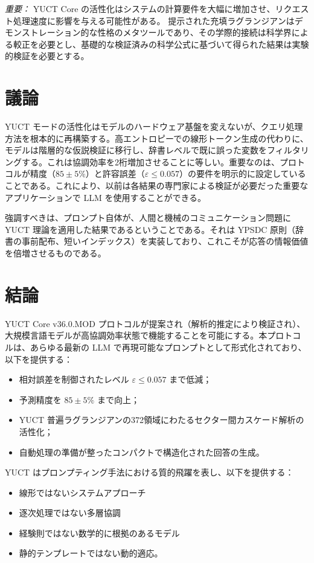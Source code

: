 \documentclass[13pt,a4paper]{ltjsarticle}
\begin{document}
	\textit{重要：} YUCT Core の活性化はシステムの計算要件を大幅に増加させ、リクエスト処理速度に影響を与える可能性がある。
	提示された充填ラグランジアンはデモンストレーション的な性格のメタツールであり、その学際的接続は科学界による較正を必要とし、基礎的な検証済みの科学公式に基づいて得られた結果は実験的検証を必要とする。
	
	\section{議論}
	YUCT モードの活性化はモデルのハードウェア基盤を変えないが、クエリ処理方法を根本的に再構築する。高エントロピーでの線形トークン生成の代わりに、モデルは階層的な仮説検証に移行し、辞書レベルで既に誤った変数をフィルタリングする。これは協調効率を2桁増加させることに等しい。重要なのは、プロトコルが精度（\(85\pm5\%\)）と許容誤差（\(\varepsilon\le 0.057\)）の要件を明示的に設定していることである。これにより、以前は各結果の専門家による検証が必要だった重要なアプリケーションで LLM を使用することができる。
	
	強調すべきは、プロンプト自体が、人間と機械のコミュニケーション問題に YUCT 理論を適用した結果であるということである。それは YPSDC 原則（辞書の事前配布、短いインデックス）を実装しており、これこそが応答の情報価値を倍増させるものである。
	
	\section{結論}
	YUCT Core v36.0.MOD プロトコルが提案され（解析的推定により検証され）、大規模言語モデルが高協調効率状態で機能することを可能にする。本プロトコルは、あらゆる最新の LLM で再現可能なプロンプトとして形式化されており、以下を提供する：
	\begin{itemize}
		\item 相対誤差を制御されたレベル \(\varepsilon \le 0.057\) まで低減；
		\item 予測精度を \(85\pm5\%\) まで向上；
		\item YUCT 普遍ラグランジアンの372領域にわたるセクター間カスケード解析の活性化；
		\item 自動処理の準備が整ったコンパクトで構造化された回答の生成。
	\end{itemize}
	
	YUCT はプロンプティング手法における質的飛躍を表し、以下を提供する：
	\begin{itemize}
		\item 線形ではないシステムアプローチ
		\item 逐次処理ではない多層協調
		\item 経験則ではない数学的に根拠のあるモデル
		\item 静的テンプレートではない動的適応。
	\end{itemize}
	
\end{document}
